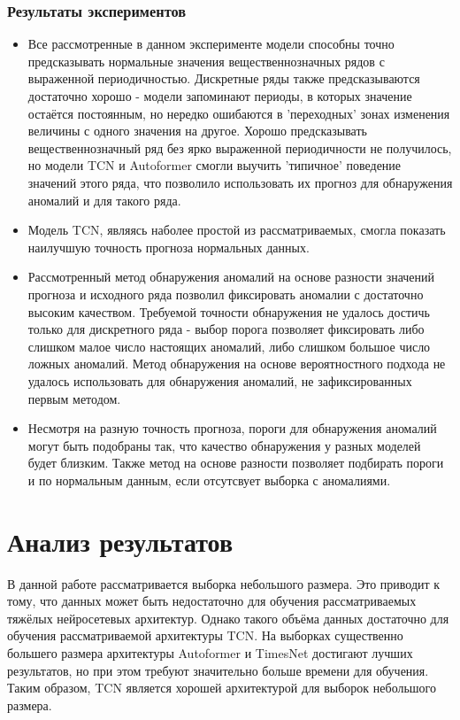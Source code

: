 \documentclass{article}
\begin{document}
\subsubsection{Результаты экспериментов}
\begin{itemize}
\item Все рассмотренные в данном эксперименте модели способны точно предсказывать нормальные значения вещественнозначных рядов с выраженной периодичностью. Дискретные ряды также предсказываются достаточно хорошо - модели запоминают периоды, в которых значение остаётся постоянным, но нередко ошибаются в 'переходных' зонах изменения величины с одного значения на другое. Хорошо предсказывать вещественнозначный ряд без ярко выраженной периодичности не получилось, но модели TCN и Autoformer смогли выучить 'типичное' поведение значений этого ряда, что позволило использовать их прогноз для обнаружения аномалий и для такого ряда. 

\item Модель TCN, являясь наболее простой из рассматриваемых, смогла показать наилучшую точность прогноза нормальных данных. 

\item Рассмотренный метод обнаружения аномалий на основе разности значений прогноза и исходного ряда позволил фиксировать аномалии с достаточно высоким качеством. Требуемой точности обнаружения не удалось достичь только для дискретного ряда - выбор порога позволяет фиксировать либо слишком малое число настоящих аномалий, либо слишком большое число ложных аномалий. Метод обнаружения на основе вероятностного подхода не удалось использовать для обнаружения аномалий, не зафиксированных первым методом.

\item Несмотря на разную точность прогноза, пороги для обнаружения аномалий могут быть подобраны так, что качество обнаружения у разных моделей будет близким. Также метод на основе разности позволяет подбирать пороги и по нормальным данным, если отсутсвует выборка с аномалиями. 
\end{itemize}

\section{Анализ результатов}
В данной работе рассматривается выборка небольшого размера. Это приводит к тому, что данных может быть недостаточно для обучения рассматриваемых тяжёлых нейросетевых архитектур. Однако такого объёма данных достаточно для обучения рассматриваемой архитектуры TCN. На выборках существенно большего размера архитектуры Autoformer и TimesNet достигают лучших результатов, но при этом требуют значительно больше времени для обучения. Таким образом, TCN является хорошей архитектурой для выборок небольшого размера.
\end{document}
